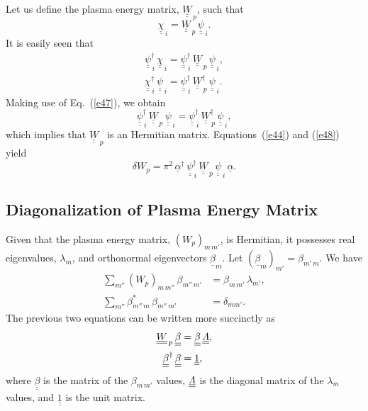 \documentclass[12pt,prb,aps,notitlepage]{revtex4-1}
\begin{document}
Let us define the plasma energy matrix, $\underline{\underline{W}}_{\,p}$, such that 
\begin{equation}\label{e48}
\underline{\underline{\chi}}_{\,i} = \underline{\underline{W}}_{\,p}\,\underline{\underline{\psi}}_{\,i}.
\end{equation}
 It is easily seen that
 \begin{align}
 \underline{\underline{\psi}}^{\dag}_{\,i}\,\underline{\underline{\chi}}_{\,i}= \underline{\underline{\psi}}^{\dag}_{\,i}\,\underline{\underline{W}}_{\,p}\,
 \underline{\underline{\psi}}_{\,i},\\[0.5ex]
 \underline{\underline{\chi}}^{\dag}_{\,i}\,\underline{\underline{\psi}}_{\,i}= \underline{\underline{\psi}}^{\dag}_{\,i}\,\underline{\underline{W}}_{\,p}^{\dag}\,
 \underline{\underline{\psi}}_{\,i}.
 \end{align}
 Making use of Eq.~(\ref{e47}), we obtain
 \begin{equation}
 \underline{\underline{\psi}}^{\dag}_{\,i}\,\underline{\underline{W}}_{\,p}\,
 \underline{\underline{\psi}}_{\,i}=
 \underline{\underline{\psi}}^{\dag}_{\,i}\,\underline{\underline{W}}_{\,p}^{\dag}\,
 \underline{\underline{\psi}}_{\,i},
 \end{equation}
 which implies that $\underline{\underline{W}}_{\,p}$ is an Hermitian matrix. Equations~(\ref{e44}) and (\ref{e48}) yield
 \begin{equation}\label{e52}
 \delta W_p = \pi^2\,\underline{\alpha}^\dag\,\underline{\underline{\psi}}^{\dag}_{\,i}\,\underline{\underline{W}}_{\,p}\,\underline{\underline{\psi}}_{\,i}\,\underline{\alpha}.
 \end{equation}
 
\subsection{Diagonalization of Plasma Energy Matrix}
Given that the plasma energy matrix, $(W_{p})_{m\,m'}$, is Hermitian, it possesses real eigenvalues, $\lambda_m$, and orthonormal
eigenvectors $\underline{\beta}_m$. Let $(\underline{\beta}_m)_{m'} = \beta_{m'\,m}$. 
We have
\begin{align}
\sum_{m''} (W_p)_{m\,m''}\,\beta_{m''\,m'} &= \beta_{m\,m'}\,\lambda_{m'},\\[0.5ex]
\sum_{m''} \beta_{m''\,m}^\ast\,\beta_{m''\,m'} &= \delta_{mm'}.
\end{align}
The previous two equations can be written more succinctly as
\begin{align}
\underline{\underline{W}}_{\,p}\,\underline{\underline{\beta}}&=\underline{\underline{\beta}}\,\underline{\underline{{\mit\Lambda}}},\label{e55}\\[0.5ex]
\underline{\underline{\beta}}^\dag\,\underline{\underline{\beta}}&= \underline{\underline{1}},\label{e56}
\end{align}
where $\underline{\underline{\beta}}$ is the matrix of the $\beta_{m\,m'}$ values, $\underline{\underline{{\mit\Lambda}}}$ is the diagonal
matrix of the $\lambda_m$ values, and $\underline{\underline{1}}$ is the unit matrix. 
\end{document}
